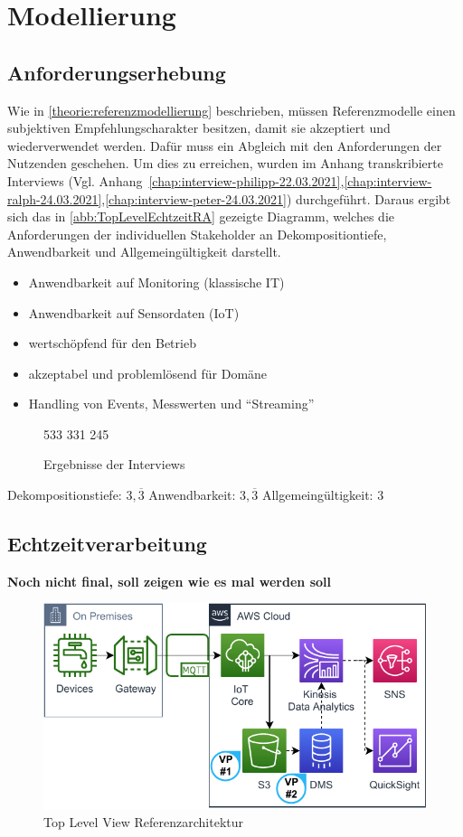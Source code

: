 \chapter{Modellierung}
\section{Anforderungserhebung}
Wie in \autoref{theorie:referenzmodellierung} beschrieben, müssen Referenzmodelle einen subjektiven Empfehlungscharakter besitzen, damit sie akzeptiert und wiederverwendet werden. Dafür muss ein Abgleich mit den Anforderungen der Nutzenden geschehen. Um dies zu erreichen, wurden im Anhang transkribierte Interviews (Vgl. Anhang~\ref{chap:interview-philipp-22.03.2021},\ref{chap:interview-ralph-24.03.2021},\ref{chap:interview-peter-24.03.2021}) durchgeführt. Daraus ergibt sich das in \autoref{abb:TopLevelEchtzeitRA} gezeigte Diagramm, welches die Anforderungen der individuellen Stakeholder an Dekompositiontiefe, Anwendbarkeit und Allgemeingültigkeit darstellt.


\begin{itemize}
\item Anwendbarkeit auf Monitoring (klassische IT)
\item Anwendbarkeit auf Sensordaten (IoT)
\item wertschöpfend für den Betrieb
\item akzeptabel und problemlösend für Domäne
\item Handling von Events, Messwerten und \enquote{Streaming}
\end{itemize}


\begin{figure}[H]
\centering
\spideroverview
{5}{3}{3}
{3}{3}{1}
{2}{4}{5}
\caption{Ergebnisse der Interviews}
\label{abb:DimensionenUebersicht}
\end{figure}
Dekompositionstiefe: $3,\overline{3}$
Anwendbarkeit: $3,\overline{3}$
Allgemeingültigkeit: $3$

\section{Echtzeitverarbeitung}
\textbf{Noch nicht final, soll zeigen wie es mal werden soll}
\begin{figure}[H]
\centering
\includegraphics[width=\textwidth]{graphics/Echtzeit-RA-Overview.pdf}
\caption{Top Level View Referenzarchitektur}
\label{abb:TopLevelEchtzeitRA}
\end{figure}


